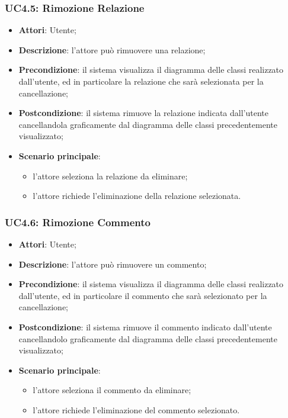 \subsubsection{UC4.5: Rimozione Relazione}
\label{UC4.5}
\begin{itemize}
	\item \textbf{Attori}: Utente;
	\item \textbf{Descrizione}: l'attore può rimuovere una relazione;
	\item \textbf{Precondizione}: il sistema visualizza il diagramma delle classi realizzato dall'utente, ed in particolare la relazione che sarà selezionata per la cancellazione;
	\item \textbf{Postcondizione}: il sistema rimuove la relazione indicata dall'utente cancellandola graficamente dal diagramma delle classi precedentemente visualizzato;
	\item \textbf{Scenario principale}:
	\begin{itemize}
		\item l'attore seleziona la relazione da eliminare;
		\item l'attore richiede l'eliminazione della relazione selezionata.
	\end{itemize}
\end{itemize}

\subsubsection{UC4.6: Rimozione Commento}
\label{UC4.6}
\begin{itemize}
	\item \textbf{Attori}: Utente;
	\item \textbf{Descrizione}: l'attore può rimuovere un commento;
	\item \textbf{Precondizione}: il sistema visualizza il diagramma delle classi realizzato dall'utente, ed in particolare il commento che sarà selezionato per la cancellazione;
	\item \textbf{Postcondizione}: il sistema rimuove il commento indicato dall'utente cancellandolo graficamente dal diagramma delle classi precedentemente visualizzato;
	\item \textbf{Scenario principale}:
	\begin{itemize}
		\item l'attore seleziona il commento da eliminare;
		\item l'attore richiede l'eliminazione del commento selezionato.
	\end{itemize}
\end{itemize}

